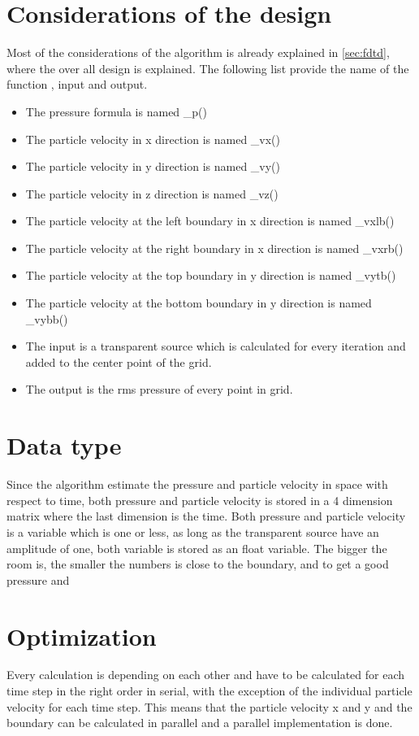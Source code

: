\section{Considerations of the design} \label{ch:considerations}
Most of the considerations of the algorithm is already explained in \autoref{sec:fdtd}, where the over all design is explained. The following list provide the name of the function , input and output. 

\begin{itemize}
\item The pressure formula is named _p() 
\item The particle velocity in x direction is named _vx()
\item The particle velocity in y direction is named _vy()
\item The particle velocity in z direction is named _vz()
\item The particle velocity at the left boundary in x direction is named _vxlb()
\item The particle velocity at the right boundary in x direction is named _vxrb()
\item The particle velocity at the top boundary in y direction is named _vytb()
\item The particle velocity at the bottom boundary in y direction is named _vybb()
\item The input is a transparent source which is calculated for every iteration and added to the center point of the grid. 
\item The output is the \gls{rms} pressure of every point in grid.
\end{itemize}

\section{Data type}
Since the algorithm estimate the pressure and particle velocity in space with respect to time, both pressure and particle velocity is stored in a 4 dimension matrix where the last dimension is the time. Both pressure and particle velocity is a variable which is one or less, as long as the transparent source have an amplitude of one, both variable is stored as an float variable. The bigger the room is, the smaller the numbers is close to the boundary, and to get a good pressure and  



\section{Optimization}
Every calculation is depending on each other and have to be calculated for each time step in the right order in serial, with the exception of the individual particle velocity for each time step. This means that the particle velocity x and y and the boundary can be calculated in parallel and a parallel implementation is done.  